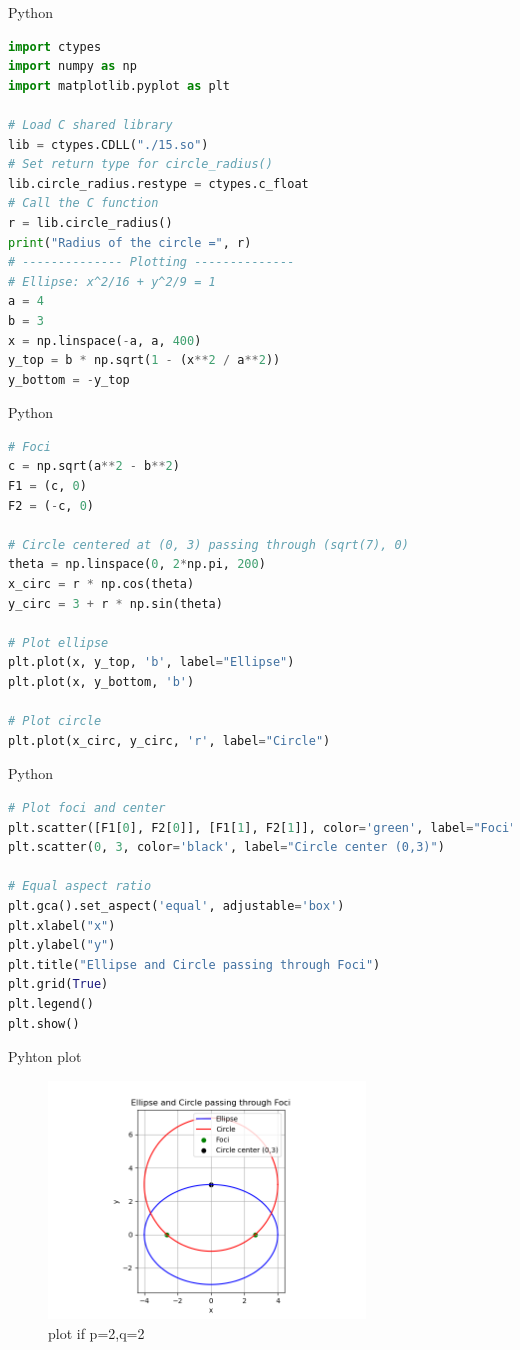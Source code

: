 \documentclass{beamer}
\begin{document}
\begin{frame}[fragile]{Python}
\begin{lstlisting}[language=Python]
import ctypes
import numpy as np
import matplotlib.pyplot as plt

# Load C shared library
lib = ctypes.CDLL("./15.so")
# Set return type for circle_radius()
lib.circle_radius.restype = ctypes.c_float
# Call the C function
r = lib.circle_radius()
print("Radius of the circle =", r)
# -------------- Plotting --------------
# Ellipse: x^2/16 + y^2/9 = 1
a = 4
b = 3
x = np.linspace(-a, a, 400)
y_top = b * np.sqrt(1 - (x**2 / a**2))
y_bottom = -y_top
\end{lstlisting}
\end{frame}
\begin{frame}[fragile]{Python}
\begin{lstlisting}[language=Python]
# Foci
c = np.sqrt(a**2 - b**2)
F1 = (c, 0)
F2 = (-c, 0)

# Circle centered at (0, 3) passing through (sqrt(7), 0)
theta = np.linspace(0, 2*np.pi, 200)
x_circ = r * np.cos(theta)
y_circ = 3 + r * np.sin(theta)

# Plot ellipse
plt.plot(x, y_top, 'b', label="Ellipse")
plt.plot(x, y_bottom, 'b')

# Plot circle
plt.plot(x_circ, y_circ, 'r', label="Circle")
\end{lstlisting}
\end{frame}
\begin{frame}[fragile]{Python}
\begin{lstlisting}[language=Python]
# Plot foci and center
plt.scatter([F1[0], F2[0]], [F1[1], F2[1]], color='green', label="Foci")
plt.scatter(0, 3, color='black', label="Circle center (0,3)")

# Equal aspect ratio
plt.gca().set_aspect('equal', adjustable='box')
plt.xlabel("x")
plt.ylabel("y")
plt.title("Ellipse and Circle passing through Foci")
plt.grid(True)
plt.legend()
plt.show()
\end{lstlisting}
\end{frame}

\begin{frame}{Pyhton plot}
\begin{figure}[h!]
    \centering
    \includegraphics[width=0.75\textwidth]{figs/15.png}
    \caption{plot if p=2,q=2}
    \label{fig:example_image}
\end{figure}
\end{frame}
\end{document}
